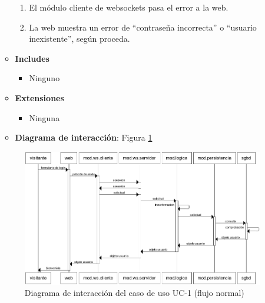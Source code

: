 \begin{enumerate}
\begin{itemize}
\begin{enumerate}
    \item El módulo cliente de websockets pasa el error a la web.
    \item La web muestra un error de ``contraseña incorrecta'' o ``usuario inexistente'', según proceda.
    \end{enumerate}
  \item \textbf{Includes}
    \begin{itemize}
    \item Ninguno
    \end{itemize}
  \item \textbf{Extensiones}
    \begin{itemize}
    \item Ninguna
    \end{itemize}
  \item {\bf Diagrama de interacción}: Figura \ref{fig::uc-1}
  \end{itemize}


  \begin{figure}[h]
    \begin{center}
      \includegraphics[width=\textwidth]{images/uc-1.png}
      \caption{Diagrama de interacción del caso de uso UC-1 (flujo normal)}
      \label{fig::uc-1}
    \end{center}
  \end{figure}



\end{enumerate}
